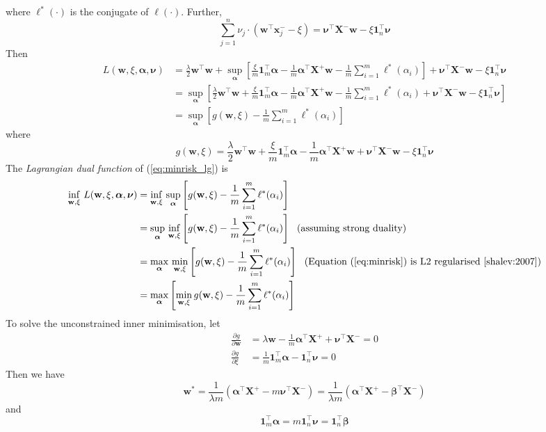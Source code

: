 \documentclass[9pt]{extarticle}
\newcommand{\x}{\mathbf{x}}
\newcommand{\X}{\mathbf{X}}
\newcommand{\1}{\mathbf{1}}
\newcommand{\w}{\mathbf{w}}
\newcommand{\alphabm}{\bm{\alpha}}
\newcommand{\betabm}{\bm{\beta}}
\newcommand{\nubm}{\bm{\nu}}
\begin{document}
where $\ell^*(\cdot)$ is the conjugate of $\ell(\cdot)$.
Further, 
$$\sum_{j=1}^n \nu_j \cdot \left( \w^\top \x_j^- - \xi \right) = \nubm^\top \X^- \w - \xi \1_n^\top \nubm$$
Then
\begin{align*}
L(\w, \xi, \alphabm, \nubm) 
&= \frac{\lambda}{2} \w^\top \w + 
   \sup_{\alphabm} \left[ \frac{\xi}{m} \1_m^\top \alphabm - \frac{1}{m} \alphabm^\top \X^+ \w - \frac{1}{m} \sum_{i=1}^m \ell^*(\alpha_i) \right] +
   \nubm^\top \X^- \w - \xi \1_n^\top \nubm \\
&= \sup_{\alphabm} \left[ 
   \frac{\lambda}{2} \w^\top \w + 
   \frac{\xi}{m} \1_m^\top \alphabm - \frac{1}{m} \alphabm^\top \X^+ \w - \frac{1}{m} \sum_{i=1}^m \ell^*(\alpha_i) +
   \nubm^\top \X^- \w - \xi \1_n^\top \nubm \right] \\
&= \sup_{\alphabm} \left[ g(\w, \xi) - \frac{1}{m} \sum_{i=1}^m \ell^*(\alpha_i) \right]
\end{align*}
where
$$g(\w, \xi) = \frac{\lambda}{2} \w^\top \w + \frac{\xi}{m} \1_m^\top \alphabm - \frac{1}{m} \alphabm^\top \X^+ \w + \nubm^\top \X^- \w - \xi \1_n^\top \nubm$$
The \emph{Lagrangian dual function} of (\ref{eq:minrisk_lg}) is
\begin{align*}
\inf_{\w, \xi} \, L(\w, \xi, \alphabm, \nubm) 
&= \inf_{\w, \xi}  \, \sup_{\alphabm} \left[ g(\w, \xi) - \frac{1}{m} \sum_{i=1}^m \ell^*(\alpha_i) \right] \\
&= \sup_{\alphabm} \, \inf_{\w, \xi} \left[ g(\w, \xi) - \frac{1}{m} \sum_{i=1}^m \ell^*(\alpha_i) \right] ~~ \text{(assuming strong duality)} \\
&= \max_{\alphabm} \, \min_{\w, \xi} \left[ g(\w, \xi) - \frac{1}{m} \sum_{i=1}^m \ell^*(\alpha_i) \right] ~~ \text{(Equation (\ref{eq:minrisk}) is L2 regularised~\cite{shalev:2007})} \\
&= \max_{\alphabm} \left[ \min_{\w, \xi} g(\w, \xi) - \frac{1}{m} \sum_{i=1}^m \ell^*(\alpha_i) \right]
\end{align*}
To solve the unconstrained inner minimisation, let
\begin{align*}
\frac{\partial g}{\partial \w}  &= \lambda \w - \frac{1}{m} \alphabm^\top \X^+ + \nubm^\top \X^- = 0 \\
\frac{\partial g}{\partial \xi} &= \frac{1}{m} \1_m^\top \alphabm - \1_n^\top \nubm = 0
\end{align*}
Then we have
$$
\w^* 
= \frac{1}{\lambda m} \left( \alphabm^\top \X^+ - m \nubm^\top \X^- \right) 
= \frac{1}{\lambda m} \left( \alphabm^\top \X^+ - \betabm^\top \X^- \right) 
$$
and
$$\1_m^\top \alphabm = m \1_n^\top \nubm = \1_n^\top \betabm$$
\end{document}
